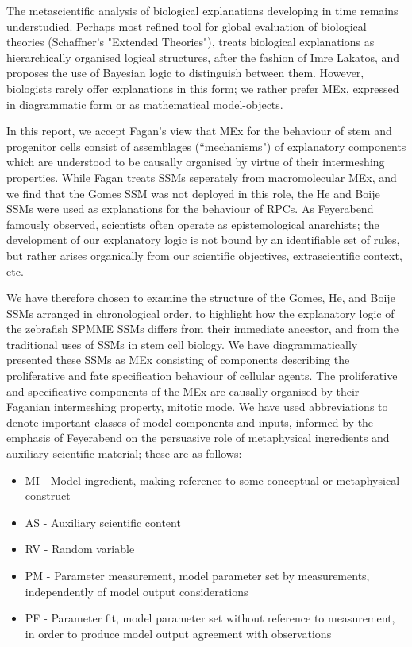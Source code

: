 \documentclass[10pt,letterpaper]{article}
\begin{document}
The metascientific analysis of biological explanations developing in time remains understudied. Perhaps most refined tool for global evaluation of biological theories (Schaffner's "Extended Theories"), treats biological explanations as hierarchically organised logical structures, after the fashion of Imre Lakatos, and proposes the use of Bayesian logic to distinguish between them\cite{Schaffner1993}. However, biologists rarely offer explanations in this form; we rather prefer MEx, expressed in diagrammatic form or as mathematical model-objects.

In this report, we accept Fagan's view that MEx for the behaviour of stem and progenitor cells consist of assemblages (``mechanisms") of explanatory components which are understood to be causally organised by virtue of their intermeshing properties\cite{Fagan2015}. While Fagan treats SSMs seperately from macromolecular MEx, and we find that the Gomes SSM was not deployed in this role, the He and Boije SSMs were used as explanations for the behaviour of RPCs. As Feyerabend famously observed, scientists often operate as epistemological anarchists; the development of our explanatory logic is not bound by an identifiable set of rules, but rather arises organically from our scientific objectives, extrascientific context, etc\cite{Feyerabend1993}.
 
We have therefore chosen to examine the structure of the Gomes, He, and Boije SSMs arranged in chronological order, to highlight how the explanatory logic of the zebrafish SPMME SSMs differs from their immediate ancestor, and from the traditional uses of SSMs in stem cell biology. We have diagrammatically presented these SSMs as MEx consisting of components describing the proliferative and fate specification behaviour of cellular agents. The proliferative and specificative components of the MEx are causally organised by their Faganian intermeshing property, mitotic mode. We have used abbreviations to denote important classes of model components and inputs, informed by the emphasis of Feyerabend on the persuasive role of metaphysical ingredients and auxiliary scientific material; these are as follows:

 \begin{itemize}
	\item{MI - Model ingredient, making reference to some conceptual or metaphysical construct}
	\item{AS - Auxiliary scientific content}
	\item{RV - Random variable}
	\item{PM - Parameter measurement, model parameter set by measurements, independently of model output considerations}
	\item{PF - Parameter fit, model parameter set without reference to measurement, in order to produce model output agreement with observations}
\end{itemize}
\end{document}
